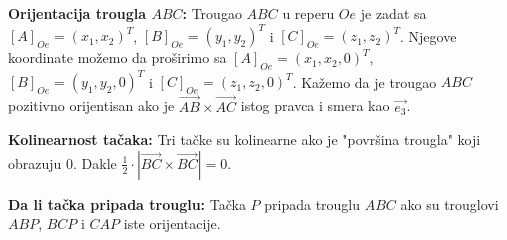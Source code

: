 \documentclass[12pt]{article}
\newcommand{\vek}[1]{\overrightarrow{#1}}
\begin{document}
\textbf{Orijentacija trougla $ABC$:} Trougao $ABC$ u reperu $Oe$ je zadat sa
$[A]_{Oe}=(x_1,x_2)^T$, $[B]_{Oe}=(y_1,y_2)^T$ i $[C]_{Oe}=(z_1,z_2)^T$.
Njegove koordinate možemo da proširimo sa
$[A]_{Oe}=(x_1,x_2,0)^T$, $[B]_{Oe}=(y_1,y_2,0)^T$ i $[C]_{Oe}=(z_1,z_2,0)^T$.
Kažemo da je trougao $ABC$ pozitivno orijentisan ako je
$\vek{AB}\times\vek{AC}$ istog pravca i smera kao $\vek{e_3}$.
\par

\textbf{Kolinearnost tačaka:} Tri tačke su kolinearne ako je "površina trougla"
koji obrazuju $0$. Dakle $\frac{1}{2}\cdot |\vek{BC}\times\vek{BC}|=0$.
\par

\textbf{Da li tačka pripada trouglu:} Tačka $P$ pripada trouglu $ABC$ ako su
trouglovi $ABP$, $BCP$ i $CAP$ iste orijentacije.
\par
\end{document}
